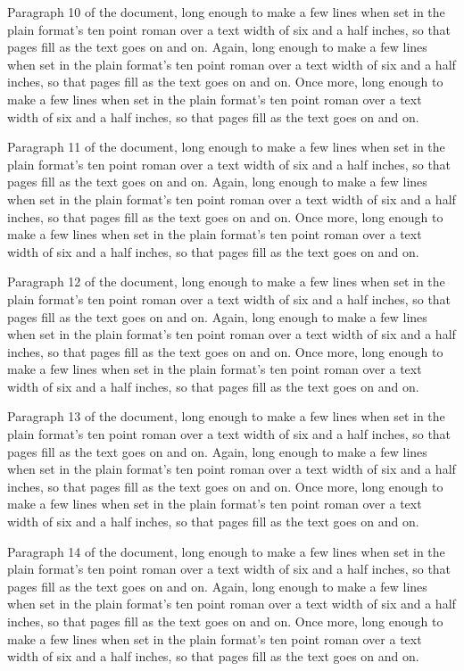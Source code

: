 Paragraph 10 of the document, long enough to make a few lines when set in the plain format's ten point roman over a text width of six and a half inches, so that pages fill as the text goes on and on. Again, long enough to make a few lines when set in the plain format's ten point roman over a text width of six and a half inches, so that pages fill as the text goes on and on. Once more, long enough to make a few lines when set in the plain format's ten point roman over a text width of six and a half inches, so that pages fill as the text goes on and on.

Paragraph 11 of the document, long enough to make a few lines when set in the plain format's ten point roman over a text width of six and a half inches, so that pages fill as the text goes on and on. Again, long enough to make a few lines when set in the plain format's ten point roman over a text width of six and a half inches, so that pages fill as the text goes on and on. Once more, long enough to make a few lines when set in the plain format's ten point roman over a text width of six and a half inches, so that pages fill as the text goes on and on.

Paragraph 12 of the document, long enough to make a few lines when set in the plain format's ten point roman over a text width of six and a half inches, so that pages fill as the text goes on and on. Again, long enough to make a few lines when set in the plain format's ten point roman over a text width of six and a half inches, so that pages fill as the text goes on and on. Once more, long enough to make a few lines when set in the plain format's ten point roman over a text width of six and a half inches, so that pages fill as the text goes on and on.

Paragraph 13 of the document, long enough to make a few lines when set in the plain format's ten point roman over a text width of six and a half inches, so that pages fill as the text goes on and on. Again, long enough to make a few lines when set in the plain format's ten point roman over a text width of six and a half inches, so that pages fill as the text goes on and on. Once more, long enough to make a few lines when set in the plain format's ten point roman over a text width of six and a half inches, so that pages fill as the text goes on and on.

Paragraph 14 of the document, long enough to make a few lines when set in the plain format's ten point roman over a text width of six and a half inches, so that pages fill as the text goes on and on. Again, long enough to make a few lines when set in the plain format's ten point roman over a text width of six and a half inches, so that pages fill as the text goes on and on. Once more, long enough to make a few lines when set in the plain format's ten point roman over a text width of six and a half inches, so that pages fill as the text goes on and on.

